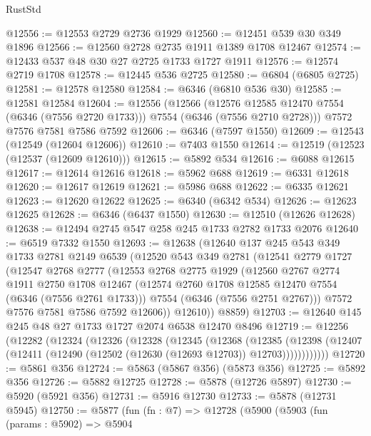 \begin{lexlean}{RustStd}
\begin{coremodule}
@12556 := @12553 @2729 @2736 @1929
@12560 := @12451 @539 @30 @349 @1896
@12566 := @12560 @2728 @2735 @1911 @1389 @1708 @12467
@12574 := @12433 @537 @48 @30 @27 @2725 @1733 @1727 @1911
@12576 := @12574 @2719 @1708
@12578 := @12445 @536 @2725
@12580 := @6804 (@6805 @2725)
@12581 := @12578 @12580
@12584 := @6346 (@6810 @536 @30)
@12585 := @12581 @12584
@12604 := @12556
    (@12566
      (@12576 @12585 @12470 @7554 (@6346 (@7556 @2720 @1733)))
      @7554
      (@6346 (@7556 @2710 @2728)))
    @7572
    @7576
    @7581
    @7586
    @7592
@12606 := @6346 (@7597 @1550)
@12609 := @12543 (@12549 (@12604 @12606))
@12610 := @7403 @1550
@12614 := @12519 (@12523 (@12537 (@12609 @12610)))
@12615 := @5892 @534
@12616 := @6088 @12615
@12617 := @12614 @12616
@12618 := @5962 @688
@12619 := @6331 @12618
@12620 := @12617 @12619
@12621 := @5986 @688
@12622 := @6335 @12621
@12623 := @12620 @12622
@12625 := @6340 (@6342 @534)
@12626 := @12623 @12625
@12628 := @6346 (@6437 @1550)
@12630 := @12510 (@12626 @12628)
@12638 := @12494 @2745 @547 @258 @245 @1733 @2782 @1733 @2076
@12640 := @6519 @7332 @1550
@12693 := @12638
    (@12640
      @137
      @245
      @543
      @349
      @1733
      @2781
      @2149
      @6539
      (@12520
        @543
        @349
        @2781
        (@12541
          @2779
          @1727
          (@12547
            @2768
            @2777
            (@12553
              @2768
              @2775
              @1929
              (@12560
                @2767
                @2774
                @1911
                @2750
                @1708
                @12467
                (@12574 @2760 @1708 @12585 @12470 @7554 (@6346 (@7556 @2761 @1733)))
                @7554
                (@6346 (@7556 @2751 @2767)))
              @7572
              @7576
              @7581
              @7586
              @7592
              @12606))
          @12610))
      @8859)
@12703 := @12640 @145 @245 @48 @27 @1733 @1727 @2074 @6538 @12470 @8496
@12719 := @12256
    (@12282
      (@12324
        (@12326
          (@12328
            (@12345
              (@12368
                (@12385
                  (@12398
                    (@12407 (@12411 (@12490 (@12502 (@12630 (@12693 @12703)) @12703))))))))))))
@12720 := @5861 @356
@12724 := @5863 (@5867 @356) (@5873 @356)
@12725 := @5892 @356
@12726 := @5882 @12725
@12728 := @5878 (@12726 @5897)
@12730 := @5920 (@5921 @356)
@12731 := @5916 @12730
@12733 := @5878 (@12731 @5945)
@12750 := @5877
    (fun (fn : @7) =>
    @12728
      (@5900
        (@5903
          (fun (params : @5902) =>
          @5904

\end{coremodule}
\end{lexlean}
